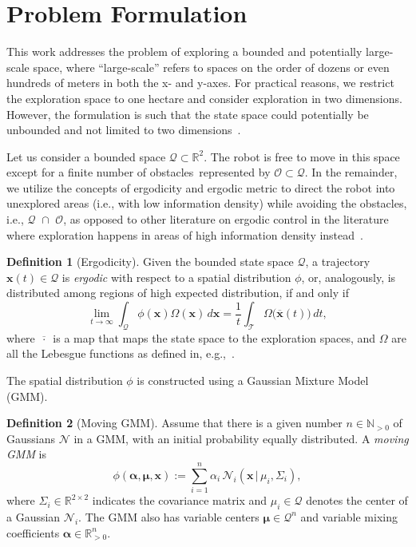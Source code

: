 \documentclass[letterpaper,10pt,conference,twoside]{IEEEtran}
\theoremstyle{definition}
\newtheorem{defn}{Definition}[section]
\begin{document}
\section{Problem Formulation}\label{sec:pb}
\noindent
This work addresses the problem of exploring a bounded and potentially large-scale space, where ``large-scale'' refers to spaces on the order of dozens or even hundreds of meters in both the x- and y-axes. For practical reasons, we restrict the exploration space to one hectare and consider exploration in two dimensions. However, the formulation is such that the state space could potentially be unbounded and not limited to two dimensions~\cite{dong2023time}.

Let us consider a bounded space $\mathcal{Q}\subset\mathbb{R}^2$. The robot is free to move in this space except for a finite number of obstacles~represented by $\mathcal{O}\subset\mathcal{Q}$. In the remainder, we utilize the concepts of ergodicity and ergodic metric to direct the robot into unexplored areas (i.e., with low information density) while avoiding the obstacles, i.e., $\mathcal{Q}\,\,\cap\,\,\mathcal{O}$, as opposed to other literature on ergodic control in the literature where exploration happens in areas of high information density instead~\cite{mathew2011metrics,abraham2017ergodic,miller2013trajectory}.

\begin{defn}[Ergodicity]
  Given the bounded state space $\mathcal{Q}$, a trajectory $\mathbf{x}(t)\in\mathcal{Q}$ is \textit{ergodic} with respect to a spatial distribution $\phi$, or, analogously, is distributed among regions of high expected distribution, if and only if
  \begin{equation}
    \lim_{t\rightarrow\infty}{\int_{\mathcal{Q}}\phi(\mathbf{x})\Omega(\mathbf{x})\,d\mathbf{x}=\frac{1}{t}\int_{\mathcal{T}}{{\Omega\big(\overline{\mathbf{x}}(t)\big)}}\,dt},
  \end{equation}
  where $\overline{\,\cdot\,}$ is a map that maps the state space to the exploration spaces, and $\Omega$ are all the Lebesgue functions as defined in, e.g.,~\cite{mathew2011metrics}.
\end{defn}

The spatial distribution $\phi$ is constructed using a Gaussian Mixture Model (GMM). 
\begin{defn}[Moving GMM]\label{def:movement}
  Assume that there is a given number $n\in\mathbb{N}_{>0}$ of Gaussians $\mathcal{N}$ in a GMM, with an initial probability equally distributed. A \textit{moving GMM} is \begin{equation}
    \phi(\boldsymbol{\alpha},\boldsymbol{\mu},\mathbf{x}):=\sum_{i=1}^n{\alpha_i\,\mathcal{N}_i(\mathbf{x}\,|\,\mu_i,\Sigma_i)},
  \end{equation}
  where $\Sigma_i\in\mathbb{R}^{2\times 2}$ indicates the covariance matrix and $\mu_i\in\mathcal{Q}$ denotes the center of a Gaussian $\mathcal{N}_i$. The GMM also has variable centers $\boldsymbol{\mu}\in\mathcal{Q}^n$ and variable mixing coefficients $\boldsymbol{\alpha}\in\mathbb{R}_{>0}^n$.
\end{defn}
\end{document}
